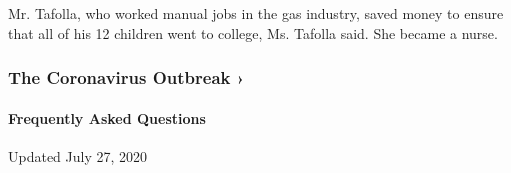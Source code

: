Mr. Tafolla, who worked manual jobs in the gas industry, saved money to
ensure that all of his 12 children went to college, Ms. Tafolla said.
She became a nurse.

\href{https://www.nytimes.com/news-event/coronavirus?action=click\&pgtype=Article\&state=default\&region=MAIN_CONTENT_3\&context=storylines_faq}{}

\hypertarget{the-coronavirus-outbreak-}{%
\subsubsection{The Coronavirus Outbreak
›}\label{the-coronavirus-outbreak-}}

\hypertarget{frequently-asked-questions}{%
\paragraph{Frequently Asked
Questions}\label{frequently-asked-questions}}

Updated July 27, 2020

